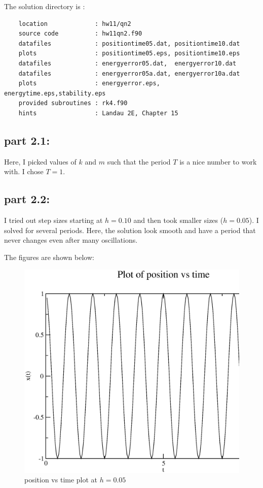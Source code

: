 \documentclass[11pt,a4paper,english]{article}
\begin{document}
		The solution directory is :\\
	\begin{verbatim}
	location             : hw11/qn2    
	source code          : hw11qn2.f90
	datafiles            : positiontime05.dat, positiontime10.dat
	plots                : positiontime05.eps, positiontime10.eps
	datafiles            : energyerror05.dat,  energyerror10.dat   
	datafiles            : energyerror05a.dat, energyerror10a.dat 
	plots                : energyerror.eps,    energytime.eps,stability.eps
	provided subroutines : rk4.f90
	hints                : Landau 2E, Chapter 15 
	\end{verbatim}

	\subsection{part 2.1: }	
	Here, I picked values of $k$ and $m$ such that the period $T$ is a nice
	number to work with. I chose $T =1$.

	\subsection{part 2.2: }
	
    I tried out step sizes starting at $h = 0.10$ and then took smaller sizes ($h=0.05$).
    I solved for several periods. Here, the solution look smooth and have a period
    that never changes even after many oscillations.
    
			    The figures are shown below:\\
	\begin{figure}[h!]
	\centering
	\includegraphics [scale=0.5]{figures/positiontime05.eps}
	\caption{position vs time plot at $h=0.05$ }
	\end{figure}
	
\end{document}
